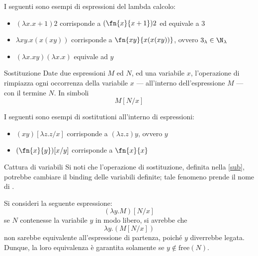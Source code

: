 \documentclass[a4paper, 12pt]{report}
\begin{document}
    \begin{example}
        I seguenti sono esempi di espressioni del lambda calcolo:

        \begin{itemize}
            \item $(\lambda x.x +1)2$ corrisponde a $(\fn{x}{x+1})2$ ed equivale a 3
            \item $\lambda xy.x(x(xy))$ corrisponde a $\fn{xy}{x(x(xy))}$, ovvero $3_\lambda \in \N_\lambda$
            \item $(\lambda x.xy)(\lambda x.x)$ equivale ad $y$
        \end{itemize}
    \end{example}

    \begin{frameddefn}[label={sub}]{Sostituzione}
        Date due espressioni $M$ ed $N$, ed una variabile $x$, l'operazione di  rimpiazza ogni occorrenza della variabile $x$ --- all'interno dell'espressione $M$ --- con il termine $N$. In simboli $$M[N/x]$$ 
    \end{frameddefn}

    \begin{example}[Sostituzioni]
        I seguenti sono esempi di sostitutioni all'interno di espressioni:

        \begin{itemize}
            \item $(xy)[\lambda z.z/x]$ corrisponde a $(\lambda z.z)y$, ovvero $y$
            \item $(\fn{x}{y})[x/y]$ corrisponde a $\fn{x}{x}$
        \end{itemize}
    \end{example}

    \begin{framedobs}{Cattura di variabili}
        Si noti che l'operazione di sostituzione, definita nella \cref{sub}, potrebbe cambiare il binding delle variabili definite; tale fenomeno prende il nome di .
    \end{framedobs}

    \begin{example}
        Si consideri la seguente espressione: $$(\lambda y.M)[N/x]$$ se $N$ contenesse la variabile $y$ in modo libero, si avrebbe che $$\lambda y.(M[N/x])$$ non sarebbe equivalente all'espressione di partenza, poiché $y$ diverrebbe legata. Dunque, la loro equivalenza è garantita solamente se $y \notin \mathrm{free}(N)$.
    \end{example}
\end{document}
